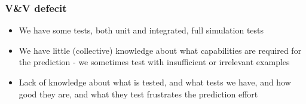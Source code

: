 
\begin{frame}\frametitle{\mirgecom{} V\&V defecit}
\begin{itemize}
\item We have some tests, both unit and integrated, full simulation tests
\item We have little (collective) knowledge about what capabilities are required for the prediction - we sometimes test with insufficient or irrelevant examples
\item Lack of knowledge about what is tested, and what tests we have, and how good they are, and what they test frustrates the prediction effort
\end{itemize}
\end{frame}


%

